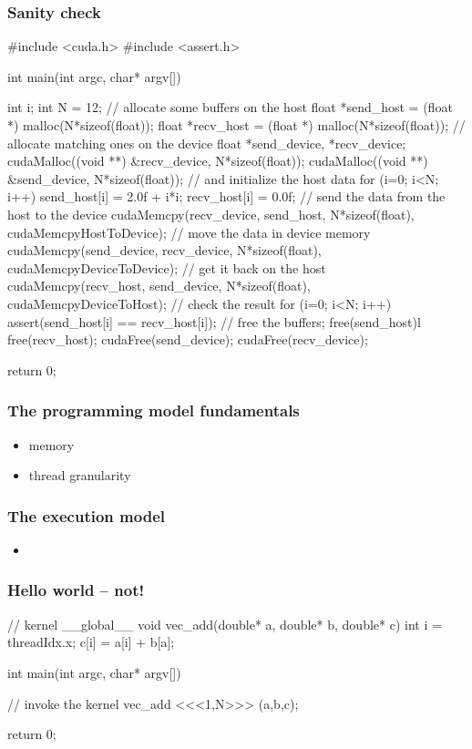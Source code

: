 \begin{frame}[fragile]
%
  \frametitle{Sanity check}
  \label{slide:sanity-cuda}
%
  \begin{C}[basicstyle=\tt\bfseries\tiny]
#include <cuda.h>
#include <assert.h>

int main(int argc, char* argv[]) {
    int i;
    int N = 12;
    // allocate some buffers on the host
    float *send_host = (float *) malloc(N*sizeof(float));
    float *recv_host = (float *) malloc(N*sizeof(float));
    // allocate matching ones on the device
    float *send_device, *recv_device;
    cudaMalloc((void **) &recv_device, N*sizeof(float));
    cudaMalloc((void **) &send_device, N*sizeof(float));
    // and initialize the host data
    for (i=0; i<N; i++) {
        send_host[i] = 2.0f + i*i;
        recv_host[i] = 0.0f;
    }
    // send the data from the host to the device
    cudaMemcpy(recv_device, send_host, N*sizeof(float), cudaMemcpyHostToDevice);
    // move the data in device memory
    cudaMemcpy(send_device, recv_device, N*sizeof(float), cudaMemcpyDeviceToDevice);
    // get it back on the host
    cudaMemcpy(recv_host, send_device, N*sizeof(float), cudaMemcpyDeviceToHost);
    // check the result
    for (i=0; i<N; i++) {
      assert(send_host[i] == recv_host[i]);
    }
    // free the buffers;
    free(send_host)l free(recv_host);
    cudaFree(send_device); cudaFree(recv_device);

    return 0;
}
  \end{C}
%
\end{frame}

\begin{frame}[fragile]
%
  \frametitle{The programming model fundamentals}
%
  \begin{itemize}
%
  \item memory
%
  \item thread granularity
%
  \end{itemize}
%
\end{frame}

\begin{frame}[fragile]
%
  \frametitle{The execution model}
%
  \begin{itemize}
%
  \item 
%
  \end{itemize}
%
\end{frame}

\begin{frame}[fragile]
%
  \frametitle{Hello world -- not!}
  \label{slide:hello-world-cuda}
%
  \begin{C}
// kernel
__global__ void vec_add(double* a, double* b, double* c) {
    int i = threadIdx.x;
    c[i] = a[i] + b[a];
}

int main(int argc, char* argv[]) {
  // invoke the kernel
  vec_add <<<1,N>>> (a,b,c);

  return 0;
}
  \end{C}
%
\end{frame}

